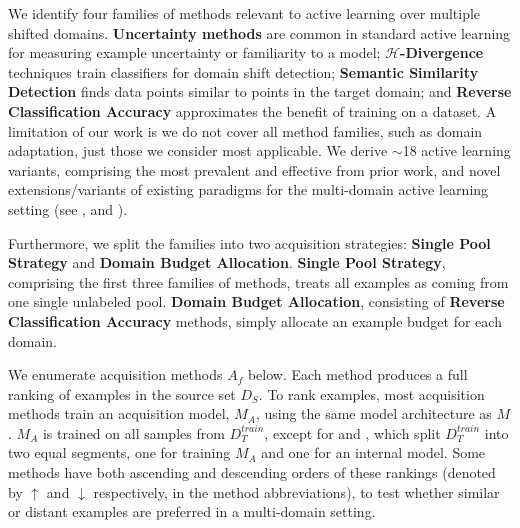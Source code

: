 We identify four families of methods relevant to active learning over multiple shifted domains.
\textbf{Uncertainty methods} are common in standard active learning for measuring example uncertainty or familiarity to a model; \textbf{$\mathcal{H}$-Divergence} techniques train classifiers for domain shift detection; \textbf{Semantic Similarity Detection} finds data points similar to points in the target domain; and \textbf{Reverse Classification Accuracy} approximates the benefit of training on a dataset. 
A limitation of our work is we do not cover all method families, such as domain adaptation, just those we consider most applicable.
We derive $\sim$18 active learning variants, comprising the most prevalent and effective from prior work, and novel extensions/variants of existing paradigms for the multi-domain active learning setting (see \knn{}, \rcas{} and \dale{}).

Furthermore, we split the families into two acquisition strategies: \textbf{Single Pool Strategy} and \textbf{Domain Budget Allocation}. 
\textbf{Single Pool Strategy}, comprising the first three families of methods, treats all examples as coming from one single unlabeled pool. \textbf{Domain Budget Allocation}, consisting of \textbf{Reverse Classification Accuracy} methods, simply allocate an example budget for each domain.

We enumerate acquisition methods $A_f$ below. 
Each method produces a full ranking of examples in the source set $D_S$.
To rank examples, most acquisition methods train an acquisition model, $M_A$, using the same model architecture as $M$. 
$M_A$ is trained on all samples from $D_T^{train}$, except for \dal{} and \knn{}, which split $D_T^{train}$ into two equal segments, one for training $M_A$ and one for an internal model.
Some methods have both ascending and descending orders of these rankings (denoted by $\uparrow$ and $\downarrow$ respectively, in the method abbreviations), to test whether similar or distant examples are preferred in a multi-domain setting.

